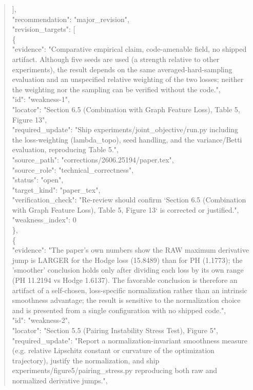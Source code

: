 \documentclass[11pt]{article}
\begin{document}
\begin{quote}
  ],\\
  "recommendation": "major\_revision",\\
  "revision\_targets": [\\
    \{\\
      "evidence": "Comparative empirical claim, code-amenable field, no shipped artifact. Although five seeds are used (a strength relative to other experiments), the result depends on the same averaged-hard-sampling evaluation and an unspecified relative weighting of the two losses; neither the weighting nor the sampling can be verified without the code.",\\
      "id": "weakness-1",\\
      "locator": "Section 6.5 (Combination with Graph Feature Loss), Table 5, Figure 13",\\
      "required\_update": "Ship experiments/joint\_objective/run.py including the loss-weighting (lambda\_topo), seed handling, and the variance/Betti evaluation, reproducing Table 5.",\\
      "source\_path": "corrections/2606.25194/paper.tex",\\
      "source\_role": "technical\_correctness",\\
      "status": "open",\\
      "target\_kind": "paper\_tex",\\
      "verification\_check": "Re-review should confirm `Section 6.5 (Combination with Graph Feature Loss), Table 5, Figure 13` is corrected or justified.",\\
      "weakness\_index": 0\\
    \},\\
    \{\\
      "evidence": "The paper's own numbers show the RAW maximum derivative jump is LARGER for the Hodge loss (15.8489) than for PH (1.1773); the 'smoother' conclusion holds only after dividing each loss by its own range (PH 11.2194 vs Hodge 1.6137). The favorable conclusion is therefore an artifact of a self-chosen, loss-specific normalization rather than an intrinsic smoothness advantage; the result is sensitive to the normalization choice and is presented from a single configuration with no shipped code.",\\
      "id": "weakness-2",\\
      "locator": "Section 5.5 (Pairing Instability Stress Test), Figure 5",\\
      "required\_update": "Report a normalization-invariant smoothness measure (e.g. relative Lipschitz constant or curvature of the optimization trajectory), justify the normalization, and ship experiments/figure5/pairing\_stress.py reproducing both raw and normalized derivative jumps.",\\

\end{quote}
\end{document}
